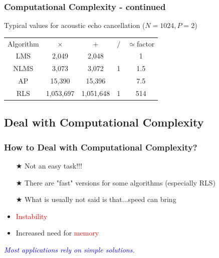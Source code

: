 \documentclass[12pt,hyperref=true,mathserif]{beamer}
\begin{document}
\begin{frame}
\frametitle{Computational Complexity - continued}
Typical values for acoustic echo cancellation ($N=1024, P=2$)
\begin{center}
\begin{tabular}{|c|c|c|c|c|}
  \hline
  Algorithm & $\times$ & $+$ & $/$ & $\simeq$factor \\
  LMS & 2,049 & 2,048 &  & 1 \\
  NLMS & 3,073 & 3,072 & 1 & 1.5 \\
  AP & 15,390 & 15,396 &  & 7.5 \\
  RLS & 1,053,697 & 1,051,648 & 1 & 514 \\
  \hline
\end{tabular}
\end{center}
\end{frame}

\subsection{Deal with Computational Complexity}
\begin{frame}
\frametitle{How to Deal with Computational Complexity?}
\begin{itemize}
  \item[$\bigstar$] Not an easy task!!!
  \item[$\bigstar$] There are "fast" versions for some algorithms (especially RLS)
  \item[$\bigstar$] What is usually not said is that...speed can bring
  \item \textcolor{red}{Instability}
  \item Increased need for \textcolor{red}{memory}
\end{itemize}
\emph{\textcolor{blue}{Most applications rely on simple solutions.}}\\
\end{frame}
\end{document}
